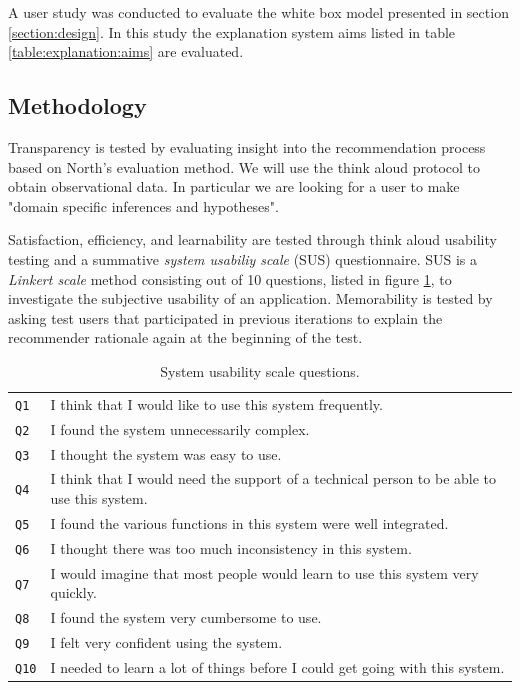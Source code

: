 \documentclass[a4paper,10pt,twocolumn]{article}
\begin{document}
A user study was conducted to evaluate the white box model presented in section \ref{section:design}. In this study the explanation system aims listed in table \ref{table:explanation:aims} are evaluated.



\subsection{Methodology}\label{section:evaluation:subsection:methodology}

Transparency is tested by evaluating insight into the recommendation process based on North's evaluation method. We will use the think aloud protocol to obtain observational data. In particular we are looking for a user to make "domain specific inferences and hypotheses"\cite{north:2006}.

Satisfaction, efficiency, and learnability are tested through think aloud usability testing and a summative \emph{system usabiliy scale} (SUS) questionnaire. SUS is a \emph{Linkert scale} method consisting out of 10 questions, listed in figure \ref{table:sus_questions}, to investigate the subjective usability of an application\cite{brooke:1996}. Memorability is tested by asking test users that participated in previous iterations to explain the recommender rationale again at the beginning of the test.

\begin{table}
	\caption{System usability scale questions.}
	\begin{tabular}{p{15px} | p{195px} } %
		\hline
		\texttt{Q1} 	&	I think that I would like to use this system frequently. \\
		\texttt{Q2}		&	I found the system unnecessarily complex. \\
		\texttt{Q3}		&	I thought the system was easy to use. \\
		\texttt{Q4} 	&	I think that I would need the support of a technical person to be able to use this system. \\
		\texttt{Q5}		&	I found the various functions in this system were well integrated. \\
		\texttt{Q6}		&	I thought there was too much inconsistency in this system. \\
		\texttt{Q7} 	&	I would imagine that most people would learn to use this system very quickly.  \\
		\texttt{Q8}		&	I found the system very cumbersome to use. \\
		\texttt{Q9}		& I felt very confident using the system. \\
		\texttt{Q10}	& I needed to learn a lot of things before I could get going with this system. \\
		\hline
	\end{tabular}
	\label{table:sus_questions}
\end{table}
\end{document}
